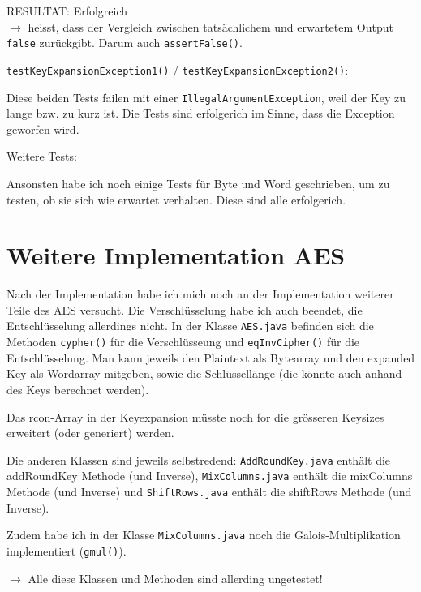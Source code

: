 \documentclass[12pt, letterpaper]{article}
\newcommand{\code}[1]{\texttt{#1}}
\begin{document}
RESULTAT: {\color{dgreen}Erfolgreich}\\
$\rightarrow$ heisst, dass der Vergleich zwischen tatsächlichem und erwartetem Output \code{false} zurückgibt. Darum auch \code{assertFalse()}.

\code{testKeyExpansionException1()} / \code{testKeyExpansionException2()}:

Diese beiden Tests failen mit einer \code{IllegalArgumentException}, weil der Key zu lange bzw. zu kurz ist. Die Tests sind {\color{dgreen}erfolgerich} im Sinne, dass die Exception geworfen wird.

Weitere Tests:

Ansonsten habe ich noch einige Tests für Byte und Word geschrieben, um zu testen, ob sie sich wie erwartet verhalten. Diese sind alle {\color{dgreen}erfolgerich}.

\newpage
\section*{Weitere Implementation AES}
Nach der Implementation habe ich mich noch an der Implementation weiterer Teile des AES versucht. Die Verschlüsselung habe ich auch beendet, die Entschlüsselung allerdings nicht. In der Klasse \code{AES.java} befinden sich die Methoden \code{cypher()} für die Verschlüsseung und \code{eqInvCipher()} für die Entschlüsselung. Man kann jeweils den Plaintext als Bytearray und den expanded Key als Wordarray mitgeben, sowie die Schlüssellänge (die könnte auch anhand des Keys berechnet werden).

Das rcon-Array in der Keyexpansion müsste noch for die grösseren Keysizes erweitert (oder generiert) werden.

Die anderen Klassen sind jeweils selbstredend: \code{AddRoundKey.java} enthält die addRoundKey Methode (und Inverse), \code{MixColumns.java} enthält die mixColumns Methode (und Inverse) und \code{ShiftRows.java} enthält die shiftRows Methode (und Inverse). 

Zudem habe ich in der Klasse \code{MixColumns.java} noch die Galois-Multiplikation implementiert (\code{gmul()}).

$\rightarrow$ Alle diese Klassen und Methoden sind allerding ungetestet!
\end{document}
